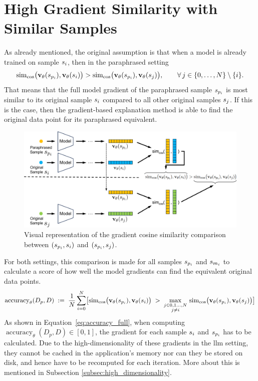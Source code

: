 \section{High Gradient Similarity with Similar Samples}
As already mentioned, the original assumption is that when a model is already trained on sample $s_i$, then in the paraphrased setting
\begin{equation}
    \operatorname{sim}_{\cos} \bigl( \mathbf{v}_{\theta}(s_{p_i}), \mathbf{v}_{\theta}(s_i) \bigr) > \operatorname{sim}_{\cos} \bigl( \mathbf{v}_{\theta}(s_{p_i}), \mathbf{v}_{\theta}(s_j) \bigr), \qquad \forall\,j\in\{0,\dots,N\}\setminus\{i\}.
    \label{eq:cosine_similarity_paraphrased}
\end{equation}
That means that the full model gradient of the paraphrased sample $s_{p_i}$ is most similar to its original sample $s_i$ compared to all other original samples $s_j$. If this is the case, then the gradient-based explanation method is able to find the original data point for its paraphrased equivalent. 
\begin{figure}[ht]
    \centering
    \includegraphics[width=1\textwidth]{figures/gradient_cosine_similarity.png}
    \caption{Visual representation of the gradient cosine similarity comparison between $(s_{p_i}, s_i)$ and $(s_{p_i}, s_j)$.}
    \label{fig:gradient_cosine_similarity}
\end{figure}
For both settings, this comparison is made for all samples $s_{p_i}$ and $s_{m_i}$ to calculate a score of how well the model gradients can find the equivalent original data points. 
\begin{equation}
\operatorname{accuracy}_\theta(D_p, D)
\;:=\;
\frac{1}{N}\sum_{i=0}^{N}
\bigl[
  \operatorname{sim}_{\cos} \bigl( \mathbf{v}_{\theta}(s_{p_i}),\mathbf{v}_{\theta}(s_i) \bigr)
  \;>\;
  \max_{\substack{j \in 0,1\dots,N  \\j \neq i}}\,
  \operatorname{sim}_{\cos} \bigl( \mathbf{v}_{\theta}(s_{p_i}),\mathbf{v}_{\theta}(s_j) \bigr)
\bigr]
\label{eq:accuracy_full}
\end{equation}
As shown in Equation~\ref{eq:accuracy_full}, when computing $\operatorname{accuracy}_\theta(D_p, D) \in [0,1]$, the gradient for each sample $s_i$ and $s_{p_i}$ has to be calculated. Due to the high-dimensionality of these gradients in the \acrshort{llm} setting, they cannot be cached in the application's memory nor can they be stored on disk, and hence have to be recomputed for each iteration. More about this is mentioned in Subsection \ref{subsec:high_dimensionality}.

